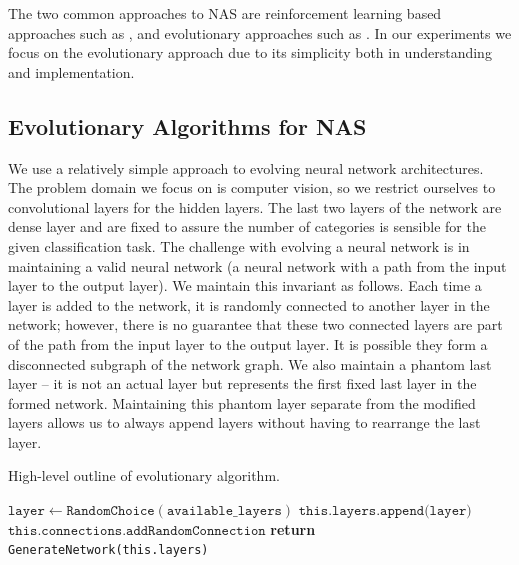 \documentclass[conference]{IEEEtran}
\begin{document}
The two common approaches to NAS are reinforcement learning based approaches such
as \cite{45826, Kyriakides:2018:NAS:3200947.3208068, pmlr-v80-pham18a}, and
evolutionary approaches such as \cite{DBLP:journals/corr/abs-1711-00436,
  DBLP:journals/corr/MiikkulainenLMR17, DBLP:conf/icml/RealMSSSTLK17}. In our
experiments we focus on the evolutionary approach due to its simplicity both in
understanding and implementation.

\subsection{Evolutionary Algorithms for NAS}
We use a relatively simple approach to evolving neural network architectures.
The problem domain we focus on is computer vision, so we restrict ourselves
to convolutional layers for the hidden layers. The last two layers of the
network are dense layer and are fixed to assure the number of categories
is sensible for the given classification task. The challenge with evolving
a neural network is in maintaining a valid neural network (a neural network
with a path from the input layer to the output layer). We maintain this
invariant as follows. Each time a layer is added to the network, it is
randomly connected to another layer in the network; however, there is
no guarantee that these two connected layers are part of the path from
the input layer to the output layer. It is possible they form a disconnected
subgraph of the network graph. We also maintain a phantom last layer --
it is not an actual layer but represents the first fixed last layer in
the formed network. Maintaining this phantom layer separate from the modified
layers allows us to always append layers without having to rearrange the
last layer.

\begin{algorithm}
  \caption{High-level outline of evolutionary algorithm.}\label{alg:evo-simple}
  \begin{algorithmic}[1]
    \State $\texttt{layer} \gets
    \texttt{RandomChoice}(\texttt{available\_layers})$
    \State $\texttt{this.layers.append(layer)}$
    \State $\texttt{this.connections.addRandomConnection}$
    \State {}
    \EndWhile
    \State \textbf{return} \texttt{GenerateNetwork(this.layers)}
    \EndProcedure
  \end{algorithmic}
\end{algorithm}
\end{document}
